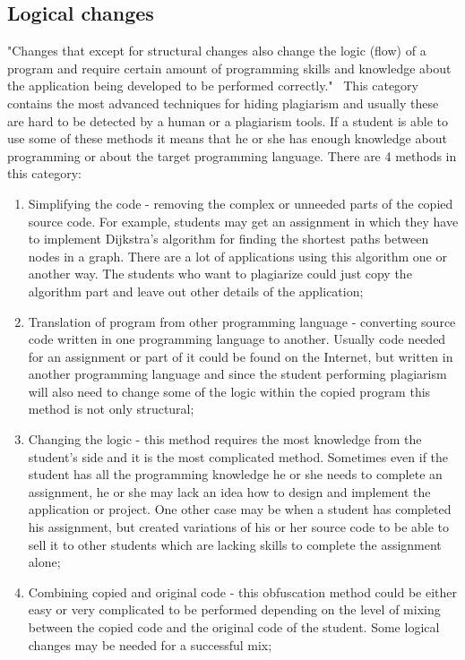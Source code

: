 \documentclass[12pt]{article}
\begin{document}
\subsection{Logical changes} \label{sec:Logical changes}
"Changes that except for structural changes also change the logic (flow) of a program and require certain amount of programming skills and knowledge about the application being developed to be performed correctly."~\cite{novak} This category contains the most advanced techniques for hiding plagiarism and usually these are hard to be detected by a human or a plagiarism tools. If a student is able to use some of these methods it means that he or she has enough knowledge about programming or about the target programming language. There are 4 methods in this category:

\begin{enumerate}

	\item Simplifying the code - removing the complex or unneeded parts of the copied source code. For example, students may get an assignment in which they have to implement Dijkstra's algorithm for finding the shortest paths between nodes in a graph. There are a lot of applications using this algorithm one or another way. The students who want to plagiarize could just copy the algorithm part and leave out other details of the application;

	\item Translation of program from other programming language - converting source code written in one programming language to another. Usually code needed for an assignment or part of it could be found on the Internet, but written in another programming language and since the student performing plagiarism will also need to change some of the logic within the copied program this method is not only structural;
	
	\item Changing the logic - this method requires the most knowledge from the student's side and it is the most complicated method. Sometimes even if the student has all the programming knowledge he or she needs to complete an assignment, he or she may lack an idea how to design and implement the application or project. One other case may be when a student has completed his assignment, but created variations of his or her source code to be able to sell it to other students which are lacking skills to complete the assignment alone;
	
	\item Combining copied and original code - this obfuscation method could be either easy or very complicated to be performed depending on the level of mixing between the copied code and the original code of the student. Some logical changes may be needed for a successful mix;

\end{enumerate}
\end{document}
